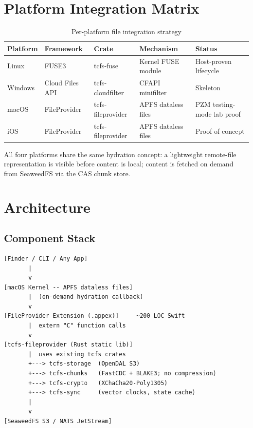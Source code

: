 \documentclass[11pt,a4paper]{article}
\begin{document}
\section{Platform Integration Matrix}

\begin{table}[H]
\centering
\begin{tabularx}{\textwidth}{lllXl}
\toprule
\textbf{Platform} & \textbf{Framework} & \textbf{Crate} & \textbf{Mechanism} & \textbf{Status} \\
\midrule
Linux   & FUSE3                & tcfs-fuse         & Kernel FUSE module           & Host-proven lifecycle \\
Windows & Cloud Files API      & tcfs-cloudfilter  & CFAPI minifilter             & Skeleton \\
macOS   & FileProvider         & tcfs-fileprovider & APFS dataless files          & PZM testing-mode lab proof \\
iOS     & FileProvider         & tcfs-fileprovider & APFS dataless files          & Proof-of-concept \\
\bottomrule
\end{tabularx}
\caption{Per-platform file integration strategy}
\end{table}

All four platforms share the same hydration concept: a lightweight remote-file
representation is visible before content is local; content is fetched on
demand from SeaweedFS via the CAS chunk store.

\section{Architecture}

\subsection{Component Stack}

\begin{lstlisting}[language={},title={FileProvider component stack}]
[Finder / CLI / Any App]
       |
       v
[macOS Kernel -- APFS dataless files]
       |  (on-demand hydration callback)
       v
[FileProvider Extension (.appex)]     ~200 LOC Swift
       |  extern "C" function calls
       v
[tcfs-fileprovider (Rust static lib)]
       |  uses existing tcfs crates
       +---> tcfs-storage  (OpenDAL S3)
       +---> tcfs-chunks   (FastCDC + BLAKE3; no compression)
       +---> tcfs-crypto   (XChaCha20-Poly1305)
       +---> tcfs-sync     (vector clocks, state cache)
       |
       v
[SeaweedFS S3 / NATS JetStream]
\end{lstlisting}
\end{document}
